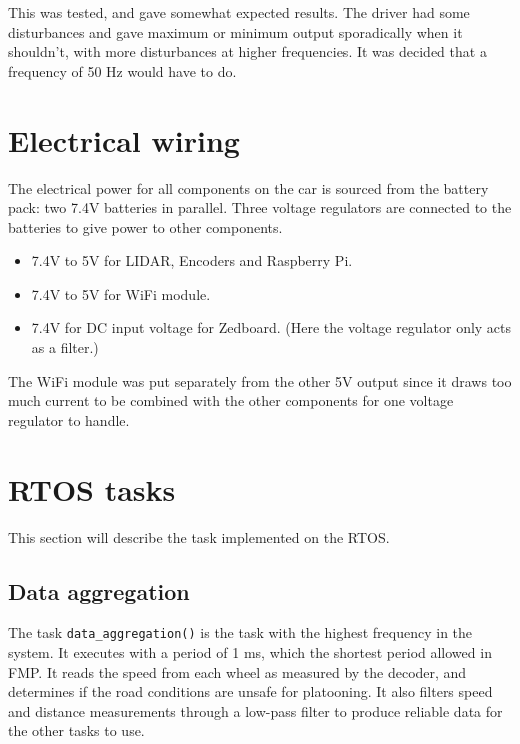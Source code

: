 This was tested, and gave somewhat expected results. The driver had some disturbances and gave maximum or minimum output sporadically when it shouldn't, with more disturbances at higher frequencies. It was decided that a frequency of 50 Hz would have to do.

\section{Electrical wiring}
The electrical power for all components on the car is sourced from the battery pack: two 7.4V batteries in parallel. Three voltage regulators are connected to the batteries to give power to other components. 

\begin{itemize}

\item 7.4V to 5V for LIDAR, Encoders and Raspberry Pi.

\item 7.4V to 5V for WiFi module.

\item 7.4V for DC input voltage for Zedboard. (Here the voltage regulator only acts as a filter.)

\end{itemize}

The WiFi module was put separately from the other 5V output since it draws too much current to be combined with the other components for one voltage regulator to handle. 

\section{RTOS tasks}
This section will describe the task implemented on the RTOS.

\subsection{Data aggregation}
The task \texttt{data\_aggregation()} is the task with the highest frequency in the system. It executes with a period of 1 ms, which the shortest period allowed in FMP. It reads the speed from each wheel as measured by the decoder, and determines if the road conditions are unsafe for platooning. It also filters speed and distance measurements through a low-pass filter to produce reliable data for the other tasks to use.

